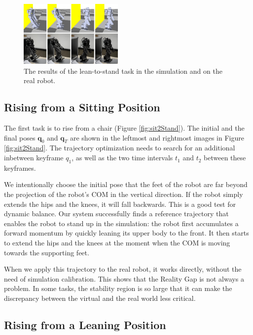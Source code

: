 \begin{figure}[!b]
  \centering
  \includegraphics[width=0.45\textwidth]{figures/lean2Stand}
  \caption{The results of the lean-to-stand task in the simulation and on the real robot.}
  \vspace{-0.1in}
  \label{fig:lean2Stand}
\end{figure}

\subsection{Rising from a Sitting Position}

The first task is to rise from a chair (Figure \ref{fig:sit2Stand}). The initial and the final poses $\mathbf{q}_0$ and $\mathbf{q}_T$ are shown in the leftmost and rightmost images in Figure \ref{fig:sit2Stand}. The trajectory optimization needs to search for an additional inbetween keyframe $q_1$, as well as the two time intervals $t_1$ and $t_2$ between these keyframes. 

We intentionally choose the initial pose that the feet of the robot are far beyond the projection of the robot's COM in the vertical direction. If the robot simply extends the hips and the knees, it will fall backwards. This is a good test for dynamic balance. Our system successfully finds a reference trajectory that enables the robot to stand up in the simulation: the robot first accumulates a forward momentum by quickly leaning its upper body to the front. It then starts to extend the hips and the knees at the moment when the COM is moving towards the supporting feet.

When we apply this trajectory to the real robot, it works directly, without the need of simulation calibration. This shows that the Reality Gap is not always a problem. In some tasks, the stability region is so large that it can make the discrepancy between the virtual and the real world less critical.

\subsection{Rising from a Leaning Position}

